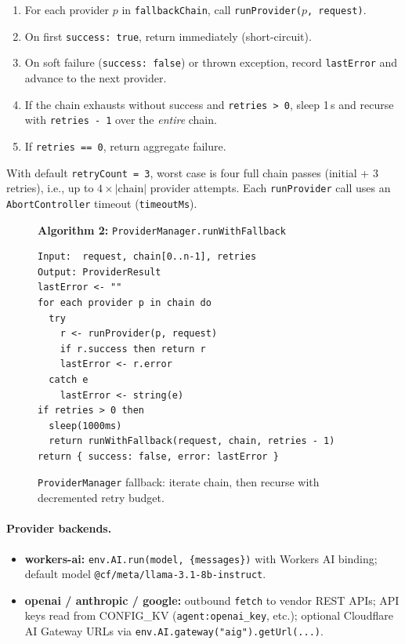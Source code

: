 \begin{enumerate}
  \item For each provider $p$ in \texttt{fallbackChain}, call \texttt{runProvider($p$, request)}.
  \item On first \texttt{success: true}, return immediately (short-circuit).
  \item On soft failure (\texttt{success: false}) or thrown exception, record \texttt{lastError} and advance to the next provider.
  \item If the chain exhausts without success and \texttt{retries > 0}, sleep 1\,s and recurse with \texttt{retries - 1} over the \emph{entire} chain.
  \item If \texttt{retries == 0}, return aggregate failure.
\end{enumerate}

With default \texttt{retryCount = 3}, worst case is four full chain passes (initial + 3 retries), i.e., up to $4 \times |\text{chain}|$ provider attempts. Each \texttt{runProvider} call uses an \texttt{AbortController} timeout (\texttt{timeoutMs}).

\begin{figure}[t]
  \centering
  \begin{minipage}{0.92\linewidth}
  \textbf{Algorithm 2:} \texttt{ProviderManager.runWithFallback}
  \label{alg:provider-fallback}
  \small
  \begin{lstlisting}
Input:  request, chain[0..n-1], retries
Output: ProviderResult
lastError <- ""
for each provider p in chain do
  try
    r <- runProvider(p, request)
    if r.success then return r
    lastError <- r.error
  catch e
    lastError <- string(e)
if retries > 0 then
  sleep(1000ms)
  return runWithFallback(request, chain, retries - 1)
return { success: false, error: lastError }
  \end{lstlisting}
  \end{minipage}
  \caption{\texttt{ProviderManager} fallback: iterate chain, then recurse with decremented retry budget.}
  \label{fig:provider-fsm}
\end{figure}

\paragraph{Provider backends.}
\begin{itemize}
  \item \textbf{workers-ai:} \texttt{env.AI.run(model, \{messages\})} with Workers AI binding; default model \texttt{@cf/meta/llama-3.1-8b-instruct}.
  \item \textbf{openai / anthropic / google:} outbound \texttt{fetch} to vendor REST APIs; API keys read from CONFIG\_KV (\texttt{agent:openai\_key}, etc.); optional Cloudflare AI Gateway URLs via \texttt{env.AI.gateway("aig").getUrl(...)}.
\end{itemize}

